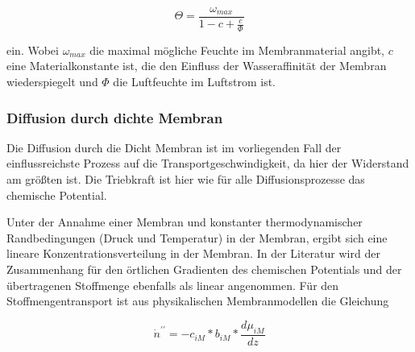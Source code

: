 \begin{normalsize}
\begin{LARGE}
\begin{equation}
\Theta = \dfrac{\omega_{max}}{1-c+\frac{c}{\Phi}}
\end{equation}

ein. Wobei $\omega_{max}$ die maximal mögliche Feuchte im Membranmaterial angibt, $c$ eine Materialkonstante ist, die den Einfluss der Wasseraffinität der Membran wiederspiegelt und $\Phi$ die Luftfeuchte im Luftstrom ist. 



\subsubsection{Diffusion durch dichte Membran}

Die Diffusion durch die Dicht Membran ist im vorliegenden Fall der einflussreichste Prozess auf die Transportgeschwindigkeit, da hier der Widerstand am größten ist. Die Triebkraft ist hier wie für alle Diffusionsprozesse das chemische Potential. 



Unter der Annahme einer Membran und konstanter thermodynamischer Randbedingungen (Druck und Temperatur) in der Membran, ergibt sich eine lineare Konzentrationsverteilung in der Membran. In der Literatur wird der Zusammenhang für den örtlichen Gradienten des chemischen Potentials und der übertragenen Stoffmenge ebenfalls als linear angenommen. 
Für den Stoffmengentransport ist aus physikalischen Membranmodellen die Gleichung 

\begin{equation}
 \dot{n}^{\prime\prime} = - c_{iM} * b_{iM} * \frac{d\mu_{iM}}{dz}
\end{equation}


\end{LARGE}
\end{normalsize}
